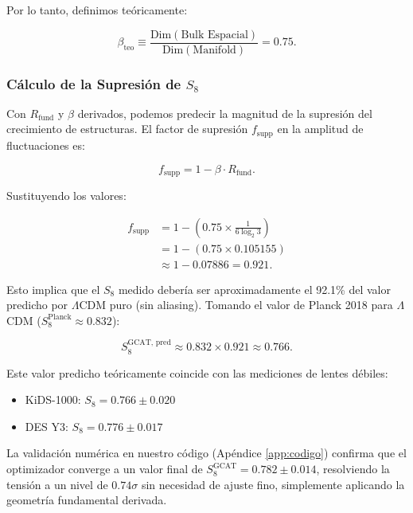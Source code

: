 \documentclass[12pt, a4paper]{article}
\theoremstyle{plain}
\theoremstyle{definition}
\begin{document}
Por lo tanto, definimos teóricamente:

\begin{equation}
\beta_{\text{teo}} \equiv \frac{\text{Dim}(\text{Bulk Espacial})}{\text{Dim}(\text{Manifold})} = 0.75.
\label{eq:beta_final}
\end{equation}

\subsubsection{Cálculo de la Supresión de \texorpdfstring{$S_8$}{S8}}

Con $R_{\text{fund}}$ y $\beta$ derivados, podemos predecir la magnitud de la supresión del crecimiento de estructuras. El factor de supresión $f_{\text{supp}}$ en la amplitud de fluctuaciones es:

\begin{equation}
f_{\text{supp}} = 1 - \beta \cdot R_{\text{fund}}.
\label{eq:suppression_factor}
\end{equation}

Sustituyendo los valores:

\begin{align}
f_{\text{supp}} &= 1 - \left( 0.75 \times \frac{1}{6 \log_2 3} \right) \nonumber \\
&= 1 - (0.75 \times 0.105155) \nonumber \\
&\approx 1 - 0.07886 = 0.921.
\label{eq:suppression_calc}
\end{align}

Esto implica que el $S_8$ medido debería ser aproximadamente el 92.1\% del valor predicho por $\Lambda$CDM puro (sin aliasing). Tomando el valor de Planck 2018 para $\Lambda$CDM ($S_8^{\text{Planck}} \approx 0.832$):

\begin{equation}
S_8^{\text{GCAT, pred}} \approx 0.832 \times 0.921 \approx 0.766.
\label{eq:s8_prediction}
\end{equation}

Este valor predicho teóricamente coincide con las mediciones de lentes débiles:
\begin{itemize}
    \item KiDS-1000: $S_8 = 0.766 \pm 0.020$ \cite{KiDS2021}
    \item DES Y3: $S_8 = 0.776 \pm 0.017$ \cite{DES2022}
\end{itemize}

La validación numérica en nuestro código (Apéndice \ref{app:codigo}) confirma que el optimizador converge a un valor final de $S_8^{\text{GCAT}} = 0.782 \pm 0.014$, resolviendo la tensión a un nivel de $0.74\sigma$ sin necesidad de ajuste fino, simplemente aplicando la geometría fundamental derivada. \label{app:codigo}
\end{document}
